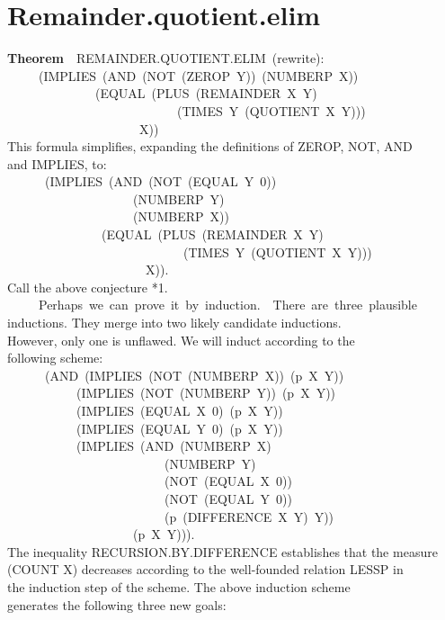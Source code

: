 \documentclass[10pt]{book}
\newenvironment{pubasis}{\begin{flushleft}}{\end{flushleft}}
\newcommand{\axiomordefinition}[1]{\vspace{6pt}\Large\textsf{\textbf{#1}}\normalsize}
\begin{document}
\section{Remainder.quotient.elim}
\begin{pubasis}
\axiomordefinition{Theorem}~~REMAINDER.QUOTIENT.ELIM~(rewrite):\\
~~~~~(IMPLIES~(AND~(NOT~(ZEROP~Y))~(NUMBERP~X))\\
~~~~~~~~~~~~~~(EQUAL~(PLUS~(REMAINDER~X~Y)\\
~~~~~~~~~~~~~~~~~~~~~~~~~~~(TIMES~Y~(QUOTIENT~X~Y)))\\
~~~~~~~~~~~~~~~~~~~~~X))\\

This formula simplifies, expanding the definitions of ZEROP, NOT, AND\\
and IMPLIES, to:\\

~~~~~~(IMPLIES~(AND~(NOT~(EQUAL~Y~0))\\
~~~~~~~~~~~~~~~~~~~~(NUMBERP~Y)\\
~~~~~~~~~~~~~~~~~~~~(NUMBERP~X))\\
~~~~~~~~~~~~~~~(EQUAL~(PLUS~(REMAINDER~X~Y)\\
~~~~~~~~~~~~~~~~~~~~~~~~~~~~(TIMES~Y~(QUOTIENT~X~Y)))\\
~~~~~~~~~~~~~~~~~~~~~~X)).\\

Call the above conjecture *1.\\

~~~~~Perhaps~we~can~prove~it~by~induction.~~There~are~three~plausible\\
inductions.  They merge into two likely candidate inductions.\\
However, only one is unflawed.  We will induct according to the\\
following scheme:\\
~~~~~~(AND~(IMPLIES~(NOT~(NUMBERP~X))~(p~X~Y))\\
~~~~~~~~~~~(IMPLIES~(NOT~(NUMBERP~Y))~(p~X~Y))\\
~~~~~~~~~~~(IMPLIES~(EQUAL~X~0)~(p~X~Y))\\
~~~~~~~~~~~(IMPLIES~(EQUAL~Y~0)~(p~X~Y))\\
~~~~~~~~~~~(IMPLIES~(AND~(NUMBERP~X)\\
~~~~~~~~~~~~~~~~~~~~~~~~~(NUMBERP~Y)\\
~~~~~~~~~~~~~~~~~~~~~~~~~(NOT~(EQUAL~X~0))\\
~~~~~~~~~~~~~~~~~~~~~~~~~(NOT~(EQUAL~Y~0))\\
~~~~~~~~~~~~~~~~~~~~~~~~~(p~(DIFFERENCE~X~Y)~Y))\\
~~~~~~~~~~~~~~~~~~~~(p~X~Y))).\\
The inequality RECURSION.BY.DIFFERENCE establishes that the measure\\
(COUNT X) decreases according to the well-founded relation LESSP in\\
the induction step of the scheme.  The above induction scheme\\
generates the following three new goals:\\


\end{pubasis}
\end{document}
